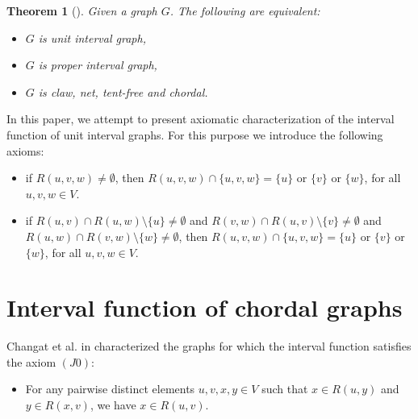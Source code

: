 \documentclass[10pt,a4paper]{article}
\newtheorem{theorem}{Theorem}
\begin{document}
\begin{theorem}[\cite{Lekkerkerker-Boland, Roberts}]
Given a graph $G$. The following are equivalent:
\begin{itemize}
\item[(a)] $G$ is unit interval graph,
\item [(b)] $G$ is proper interval graph,
\item [(c)] $G$ is {claw, net, tent}-free and chordal.
\end{itemize}

\end{theorem}


In this paper, we attempt to present axiomatic characterization of the interval function of unit interval graphs. For this purpose we introduce the following axioms:

\begin{itemize}
\item[$(u1)$] if $R(u,v,w)\neq\emptyset$, then $R(u,v,w)\cap \{u,v,w\}=\{u\}$ or $\{v\}$ or $\{w\}$, for all $u,v,w\in V $.
\end{itemize}


\begin{itemize}
\item[$(u2)$] if $R(u,v)\cap R(u,w)\setminus \{u\}\neq\emptyset$ and $R(v,w)\cap R(u,v)\setminus \{v\}\neq\emptyset$ and $R(u,w)\cap R(v,w)\setminus \{w\}\neq\emptyset$, then $R(u,v,w)\cap \{u,v,w\}=\{u\}$ or $\{v\}$ or $\{w\}$, for all $u,v,w\in V $.
\end{itemize}





\section{Interval function of chordal graphs}
Changat et al. in \cite{Changat-22} characterized the graphs for which the interval function satisfies the axiom $(J0)$:

\begin{itemize}
\item[$(J_{0})$]  For any pairwise distinct elements  $u, v, x, y \in V$ such that $x \in R(u, y)$ and $y \in R(x, v)$, we have $x \in R(u, v)$.
\end{itemize}
\end{document}
